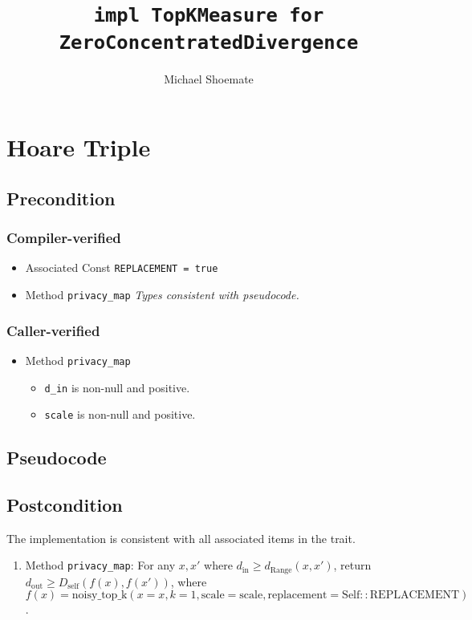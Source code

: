 \documentclass{article}
\title{\texttt{impl TopKMeasure for ZeroConcentratedDivergence}}
\author{Michael Shoemate}
\begin{document}
\maketitle

\section{Hoare Triple}
\subsection*{Precondition}
\subsubsection*{Compiler-verified}
\begin{itemize}
    \item Associated Const \texttt{REPLACEMENT = true}
    \item Method \texttt{privacy\_map}
        \textit{Types consistent with pseudocode.}
\end{itemize}

\subsubsection*{Caller-verified}
\begin{itemize}
    \item Method \texttt{privacy\_map}
        \begin{itemize}
            \item \texttt{d\_in} is non-null and positive.
            \item \texttt{scale} is non-null and positive.
        \end{itemize}
\end{itemize}

\subsection*{Pseudocode}
\label{sec:python-pseudocode}


\subsection*{Postcondition}
\begin{theorem}
    The implementation is consistent with all associated items in the  trait.
    \begin{enumerate}
        \item Method \texttt{privacy\_map}:
        For any $x, x'$ where $d_\mathrm{in} \ge d_\mathrm{Range}(x, x')$,
        return $d_\mathrm{out} \ge D_\mathrm{self}(f(x), f(x'))$,
        where $f(x) = \mathrm{noisy\_top\_k}(x=x, k=1, \mathrm{scale}=\mathrm{scale}, \mathrm{replacement}=\mathrm{Self::REPLACEMENT})$.
    \end{enumerate}
\end{theorem}
\end{document}
